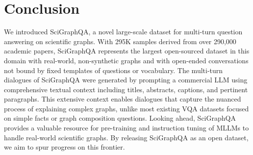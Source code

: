 \documentclass{article}
\begin{document}
\section{Conclusion}
We introduced SciGraphQA, a novel large-scale dataset for multi-turn question answering on scientific graphs. With 295K samples derived from over 290,000 academic papers, SciGraphQA represents the largest open-sourced dataset in this domain with real-world, non-synthetic graphs and with open-ended conversations not bound by fixed templates of questions or vocabulary. The multi-turn dialogues of SciGraphQA were generated by prompting a commercial LLM using comprehensive textual context including titles, abstracts, captions, and pertinent paragraphs. This extensive context enables dialogues that capture the nuanced process of explaining complex graphs, unlike most existing VQA datasets focused on simple facts or graph composition questions. Looking ahead, SciGraphQA provides a valuable resource for pre-training and instruction tuning of MLLMs to handle real-world scientific graphs. By releasing SciGraphQA as an open dataset, we aim to spur progress on this frontier.



\end{document}
